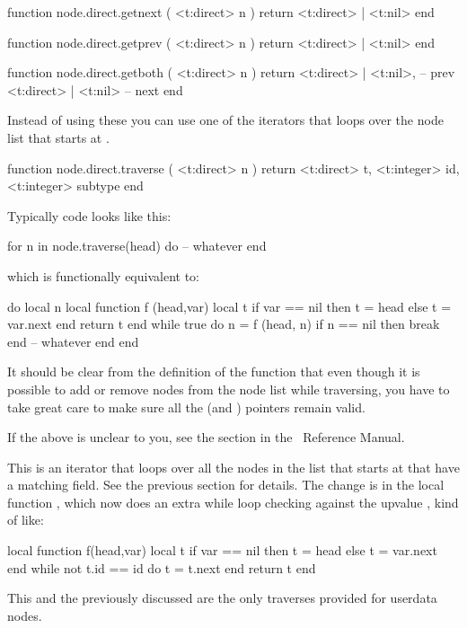 \starttyping[option=LUA]
function node.direct.getnext ( <t:direct> n )
    return <t:direct> | <t:nil>
end

function node.direct.getprev ( <t:direct> n )
    return <t:direct> | <t:nil>
end

function node.direct.getboth ( <t:direct> n )
    return
        <t:direct> | <t:nil>, -- prev
        <t:direct> | <t:nil>  -- next
end
\stoptyping

Instead of using these you can use one of the iterators that loops over the node
list that starts at .

\starttyping[option=LUA]
function node.direct.traverse ( <t:direct> n )
    return
        <t:direct>  t,
        <t:integer> id,
        <t:integer> subtype
end
\stoptyping

Typically code looks like this:

\starttyping[option=LUA]
for n in node.traverse(head) do
    -- whatever
end
\stoptyping

which is functionally equivalent to:

\starttyping[option=LUA]
do
    local n
    local function f (head,var)
        local t
        if var == nil then
            t = head
        else
            t = var.next
        end
        return t
    end
    while true do
        n = f (head, n)
        if n == nil then
            break
        end
        -- whatever
    end
end
\stoptyping

It should be clear from the definition of the function  that even though
it is possible to add or remove nodes from the node list while traversing, you
have to take great care to make sure all the  (and )
pointers remain valid.

If the above is unclear to you, see the section  in the
\LUA\ Reference Manual.

This is an iterator that loops over all the nodes in the list that starts at
 that have a matching  field. See the previous section for
details. The change is in the local function , which now does an extra
while loop checking against the upvalue , kind of like:

\starttyping[option=LUA]
local function f(head,var)
    local t
    if var == nil then
        t = head
    else
        t = var.next
    end
    while not t.id == id do
        t = t.next
    end
    return t
end
\stoptyping

This and the previously discussed  are the only traverses
provided for userdata nodes.

